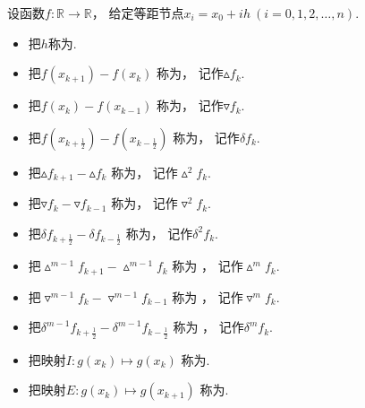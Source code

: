 \begin{definition}
设函数\(f\colon \mathbb{R} \to \mathbb{R}\)，
给定等距节点\(x_i = x_0 + i h\ (i=0,1,2,\dotsc,n)\).
\begin{itemize}
	\item 把\(h\)称为.

	\item 把\(f(x_{k+1}) - f(x_k)\)
	称为，
	记作\(\vartriangle f_k\).

	\item 把\(f(x_k) - f(x_{k-1})\)
	称为，
	记作\(\triangledown f_k\).

	\item 把\(f(x_{k+\frac12}) - f(x_{k-\frac12})\)
	称为，
	记作\(\delta f_k\).

	\item 把\(\vartriangle f_{k+1} - \vartriangle f_k\)
	称为，
	记作\(\vartriangle^2 f_k\).

	\item 把\(\triangledown f_k - \triangledown f_{k-1}\)
	称为，
	记作\(\triangledown^2 f_k\).

	\item 把\(\delta f_{k+\frac12} - \delta f_{k-\frac12}\)
	称为，
	记作\(\delta^2 f_k\).

	\item 把\(\vartriangle^{m-1} f_{k+1} - \vartriangle^{m-1} f_k\)
	称为 ，
	记作\(\vartriangle^m f_k\).

	\item 把\(\triangledown^{m-1} f_k - \triangledown^{m-1} f_{k-1}\)
	称为 ，
	记作\(\triangledown^m f_k\).

	\item 把\(\delta^{m-1} f_{k+\frac12} - \delta^{m-1} f_{k-\frac12}\)
	称为 ，
	记作\(\delta^m f_k\).

	\item 把映射\(I\colon g(x_k) \mapsto g(x_k)\)
	称为.

	\item 把映射\(E\colon g(x_k) \mapsto g(x_{k+1})\)
	称为.
\end{itemize}
\end{definition}

